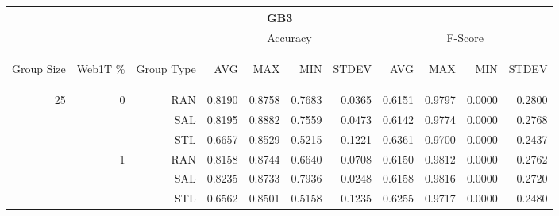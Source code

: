 \begin{center}
\begin{table}[htbp]
\begin{tabular}{ | r | r | r | r | r | r | r | r | r | r | r |}
\hline
\multicolumn{11}{|c|}{GB3}\\
\hline
 & & & \multicolumn{4}{|c|}{Accuracy} & \multicolumn{4}{|c|}{F-Score}\\ \cline{4-11}
\begin{sideways}Group Size\end{sideways} & \begin{sideways}Web1T \%\end{sideways} & \begin{sideways}Group Type\end{sideways} & \begin{sideways}AVG\end{sideways} & \begin{sideways}MAX\end{sideways} & \begin{sideways}MIN\end{sideways} & \begin{sideways}STDEV\end{sideways} & \begin{sideways}AVG\end{sideways} & \begin{sideways}MAX\end{sideways} & \begin{sideways}MIN\end{sideways} & \begin{sideways}STDEV\end{sideways}\\
\hline
\multirow{15}{*}{25}
 & \multirow{3}{*}{0} & RAN & 0.8190 & 0.8758 & 0.7683 & 0.0365 & 0.6151 & 0.9797 & 0.0000 & 0.2800\\ \cline{3-11}
 &   & SAL & 0.8195 & 0.8882 & 0.7559 & 0.0473 & 0.6142 & 0.9774 & 0.0000 & 0.2768\\ \cline{3-11}
 &   & STL & 0.6657 & 0.8529 & 0.5215 & 0.1221 & 0.6361 & 0.9700 & 0.0000 & 0.2437\\ \cline{2-11}
 & \multirow{3}{*}{1} & RAN & 0.8158 & 0.8744 & 0.6640 & 0.0708 & 0.6150 & 0.9812 & 0.0000 & 0.2762\\ \cline{3-11}
 &   & SAL & 0.8235 & 0.8733 & 0.7936 & 0.0248 & 0.6158 & 0.9816 & 0.0000 & 0.2720\\ \cline{3-11}
 &   & STL & 0.6562 & 0.8501 & 0.5158 & 0.1235 & 0.6255 & 0.9717 & 0.0000 & 0.2480\\ \cline{2-11}

\end{tabular}
\end{table}
\end{center}
